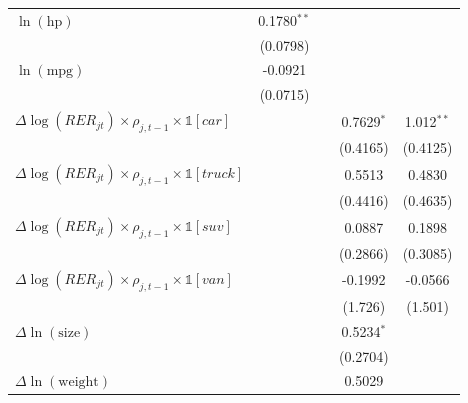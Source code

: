 \begin{table}[htbp]
\begin{tabular}{lcccc}
      $\ln(\text{hp})$                                                        & 0.1780$^{**}$ &               &              &   \\
                                                                              & (0.0798)      &               &              &   \\
      $\ln(\text{mpg})$                                                       & -0.0921       &               &              &   \\
                                                                              & (0.0715)      &               &              &   \\
      $\Delta\log(RER_{jt})\times\rho_{j,t-1} \times \mathbb{1}[car]$         &               &               & 0.7629$^{*}$ & 1.012$^{**}$\\
                                                                              &               &               & (0.4165)     & (0.4125)\\
      $\Delta\log(RER_{jt})\times\rho_{j,t-1} \times \mathbb{1}[truck]$       &               &               & 0.5513       & 0.4830\\
                                                                              &               &               & (0.4416)     & (0.4635)\\
      $\Delta\log(RER_{jt})\times\rho_{j,t-1} \times \mathbb{1}[suv]$         &               &               & 0.0887       & 0.1898\\
                                                                              &               &               & (0.2866)     & (0.3085)\\
      $\Delta\log(RER_{jt})\times\rho_{j,t-1} \times \mathbb{1}[van]$         &               &               & -0.1992      & -0.0566\\
                                                                              &               &               & (1.726)      & (1.501)\\
      $\Delta\ln(\text{size})$                                                &               &               & 0.5234$^{*}$ &   \\
                                                                              &               &               & (0.2704)     &   \\
      $\Delta\ln(\text{weight})$                                              &               &               & 0.5029       &   \\

\end{tabular}
\end{table}
